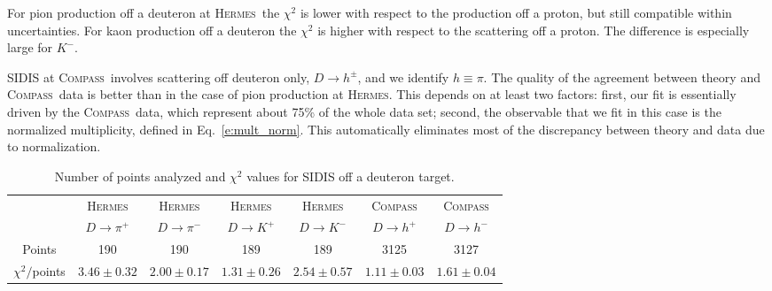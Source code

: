 \documentclass[aps,preprintnumbers,showpacs,nofootinbib,superscriptaddress,floatfix]{revtex4}
\newcommand{\hermes}{\textsc{Hermes}}
\newcommand{\compass}{\textsc{Compass}}
\begin{document}
For pion production off a deuteron at \hermes\ the $\chi^2$ is lower with
respect to the production off a proton, but still compatible within
uncertainties. For kaon production off a deuteron the $\chi^2$ is higher with
respect to the scattering off a proton. The difference is especially large for $K^-$. 

SIDIS at \compass\ involves scattering off deuteron only, $D \to h^\pm$, and we identify $h \equiv \pi$. 
The quality of the agreement between theory and \compass\ data is better than
in the case of pion production at \hermes. This depends on at least two
factors: first, our fit is essentially driven by the \compass\ data, which
represent about 75\% of the whole data set; second, the
observable that we fit in this case is the normalized
multiplicity, defined in Eq.~\eqref{e:mult_norm}. This automatically eliminates
most of the discrepancy between theory and data due to normalization. 
\begin{table}[h!]
\begin{center}
\begin{tabular}{|c|c|c|c|c|c|c|}
 \hline
\hline
  & \hermes & \hermes & \hermes & \hermes & \compass & \compass\\
 ~          &  $D \to \pi^+$    &   $D \to \pi^-$    &  $D \to K^+$    &   $D \to K^-$      &  $D \to h^+$    &   $D \to h^-$            \\
\hline
 Points         &  190 & 190 & 189 & 189   & 3125 & 3127   \\
 \hline
$\chi^2 /$points & $3.46\pm 0.32$ & $2.00\pm 0.17$ & $1.31\pm 0.26$ & $2.54\pm 0.57$  & $1.11\pm 0.03$ & $1.61\pm 0.04$ \\            
 \hline
 \hline
\end{tabular}
\caption{Number of points analyzed and $\chi^2$ values for SIDIS off a deuteron target.} 
\label{t:fl_ind_chi2_eD}
\end{center}
\end{table}


\end{document}
